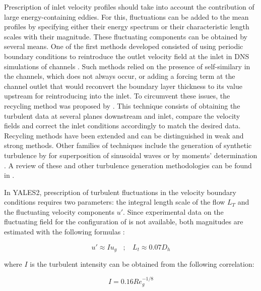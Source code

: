 Prescription of inlet velocity profiles should take into account the contribution of large energy-containing eddies. For this, fluctuations can be added to the mean profiles by specifying either their energy spectrum or their characteristic length scales with their magnitude. These fluctuating components can be obtained by several means. One of the first methods developed consisted of using periodic boundary conditions to reintroduce the outlet velocity field at the inlet in DNS simulations of channels . Such methods relied on the presence of self-similary in the channels, which does not always occur, or adding a forcing term at the channel outlet that would reconvert the boundary layer thickness to its value upstream for reintroducing into the inlet. To circumvent these issues, the recycling method was proposed by . This technique consists of obtaining the turbulent data at several planes downstream and inlet, compare the velocity fields and correct the inlet conditions accordingly to match the desired data. Recycling methods have been extended and can be distinguished in weak and strong methods. Other families of techniques include the generation of synthetic turbulence by for superposition of sinusoidal waves  or by moments' determination . A review of these and other turbulence generation methodologies can be found in \citeColor[wu_inflow_2017].

In YALES2, prescription of turbulent fluctuations in the velocity boundary conditions requires two parameters: the integral length scale of the flow $L_T$ and the fluctuating velocity components $u'$. Since experimental data on the fluctuating field for the configuration of  is not available, both magnitudes are estimated with the following formulas :

\begin{equation}
u' \approx I u_g  ~~~~ ; ~~~~ L_t \approx 0.07 D_h
\end{equation}

where $I$ is the turbulent intensity can be obtained from the following correlation:

\begin{equation}
I = 0.16 Re_g^{-1/8}
\end{equation}

